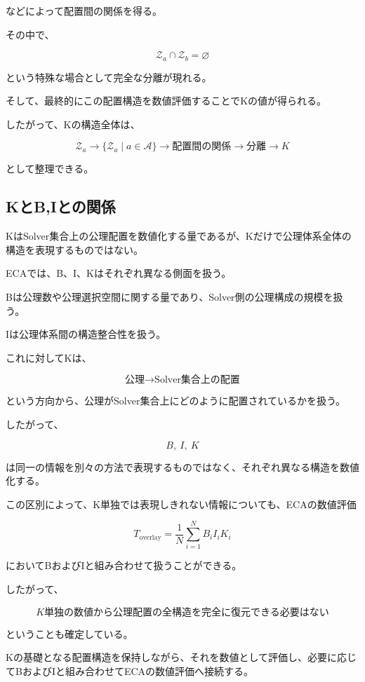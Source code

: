 などによって配置間の関係を得る。

その中で、

\[
\mathcal{Z}_a\cap\mathcal{Z}_b=\varnothing
\]

という特殊な場合として完全な分離が現れる。

そして、最終的にこの配置構造を数値評価することでKの値が得られる。

したがって、Kの構造全体は、

\[
\boxed{
\mathcal{Z}_a
\longrightarrow
\{\mathcal{Z}_a\mid a\in\mathcal{A}\}
\longrightarrow
\text{配置間の関係}
\longrightarrow
\text{分離}
\longrightarrow
K
}
\]

として整理できる。

\subsection{KとB,Iとの関係}

KはSolver集合上の公理配置を数値化する量であるが、Kだけで公理体系全体の構造を表現するものではない。

ECAでは、B、I、Kはそれぞれ異なる側面を扱う。

Bは公理数や公理選択空間に関する量であり、Solver側の公理構成の規模を扱う。

Iは公理体系間の構造整合性を扱う。

これに対してKは、

\[
\text{公理}
\longrightarrow
\text{Solver集合上の配置}
\]

という方向から、公理がSolver集合上にどのように配置されているかを扱う。

したがって、

\[
B,\ I,\ K
\]

は同一の情報を別々の方法で表現するものではなく、それぞれ異なる構造を数値化する。

この区別によって、K単独では表現しきれない情報についても、ECAの数値評価

\[
\boxed{
T_{\mathrm{overlay}} = \frac{1}{N}\sum_{i=1}^{N}B_iI_iK_i
}
\]

においてBおよびIと組み合わせて扱うことができる。

したがって、

\[
\boxed{
K\text{単独の数値から公理配置の全構造を完全に復元できる必要はない}
}
\]

ということも確定している。

Kの基礎となる配置構造を保持しながら、それを数値として評価し、必要に応じてBおよびIと組み合わせてECAの数値評価へ接続する。

